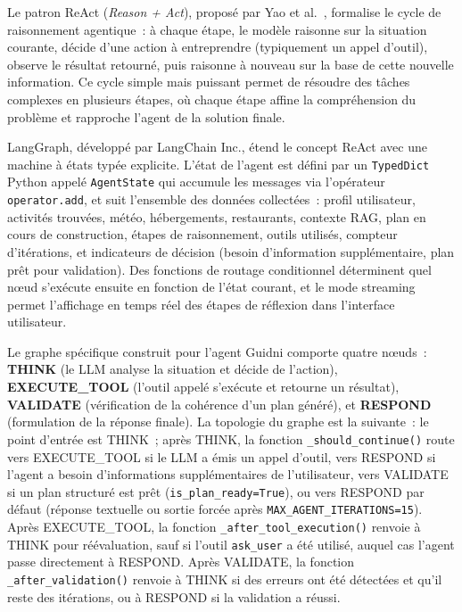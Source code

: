 Le patron ReAct (\textit{Reason + Act}), proposé par Yao et al.~\cite{yao2023react}, formalise
le cycle de raisonnement agentique~: à chaque étape, le modèle raisonne sur la situation courante,
décide d'une action à entreprendre (typiquement un appel d'outil), observe le résultat retourné,
puis raisonne à nouveau sur la base de cette nouvelle information. Ce cycle simple mais puissant
permet de résoudre des tâches complexes en plusieurs étapes, où chaque étape affine la
compréhension du problème et rapproche l'agent de la solution finale.

LangGraph, développé par LangChain Inc., étend le concept ReAct avec une machine à états typée
explicite. L'état de l'agent est défini par un \texttt{TypedDict} Python appelé \texttt{AgentState}
qui accumule les messages via l'opérateur \texttt{operator.add}, et suit l'ensemble des données
collectées~: profil utilisateur, activités trouvées, météo, hébergements, restaurants, contexte
RAG, plan en cours de construction, étapes de raisonnement, outils utilisés, compteur d'itérations,
et indicateurs de décision (besoin d'information supplémentaire, plan prêt pour validation). Des
fonctions de routage conditionnel déterminent quel nœud s'exécute ensuite en fonction de l'état
courant, et le mode streaming permet l'affichage en temps réel des étapes de réflexion dans
l'interface utilisateur.

Le graphe spécifique construit pour l'agent Guidni comporte quatre nœuds~: \textbf{THINK}
(le LLM analyse la situation et décide de l'action), \textbf{EXECUTE\_TOOL} (l'outil appelé
s'exécute et retourne un résultat), \textbf{VALIDATE} (vérification de la cohérence d'un plan
généré), et \textbf{RESPOND} (formulation de la réponse finale). La topologie du graphe est la
suivante~: le point d'entrée est THINK~; après THINK, la fonction \texttt{\_should\_continue()}
route vers EXECUTE\_TOOL si le LLM a émis un appel d'outil, vers RESPOND si l'agent a besoin
d'informations supplémentaires de l'utilisateur, vers VALIDATE si un plan structuré est prêt
(\texttt{is\_plan\_ready=True}), ou vers RESPOND par défaut (réponse textuelle ou sortie forcée
après \texttt{MAX\_AGENT\_ITERATIONS=15}). Après EXECUTE\_TOOL, la fonction
\texttt{\_after\_tool\_execution()} renvoie à THINK pour réévaluation, sauf si l'outil
\texttt{ask\_user} a été utilisé, auquel cas l'agent passe directement à RESPOND. Après VALIDATE,
la fonction \texttt{\_after\_validation()} renvoie à THINK si des erreurs ont été détectées et
qu'il reste des itérations, ou à RESPOND si la validation a réussi.

